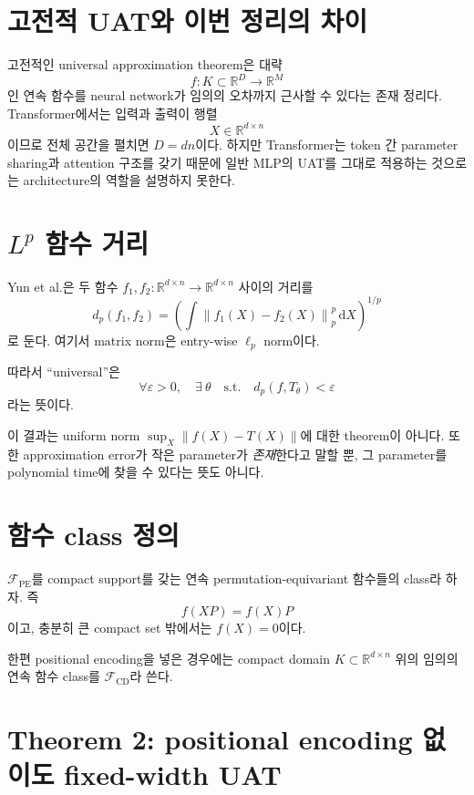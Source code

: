 \documentclass[11pt,a4paper,oneside,openany]{memoir}
\newcommand{\R}{\mathbb{R}}
\newcommand{\norm}[1]{\left\lVert #1\right\rVert}
\newcommand{\dd}{\,\mathrm{d}}
\theoremstyle{definition}
\begin{document}
\section{고전적 UAT와 이번 정리의 차이}

고전적인 universal approximation theorem은 대략
\[
f:K\subset\R^D\to\R^M
\]
인 연속 함수를 neural network가 임의의 오차까지 근사할 수 있다는 존재 정리다.
Transformer에서는 입력과 출력이 행렬
\[
X\in\R^{d\times n}
\]
이므로 전체 공간을 펼치면 $D=dn$이다. 하지만 Transformer는 token 간 parameter sharing과 attention 구조를 갖기 때문에
일반 MLP의 UAT를 그대로 적용하는 것으로는 architecture의 역할을 설명하지 못한다.

\section{\texorpdfstring{$L^p$}{Lp} 함수 거리}

Yun et al.은 두 함수 $f_1,f_2:\R^{d\times n}\to\R^{d\times n}$ 사이의 거리를
\[
d_p(f_1,f_2)
=
\left(\int
\norm{f_1(X)-f_2(X)}_p^p\dd X\right)^{1/p}
\]
로 둔다. 여기서 matrix norm은 entry-wise $\ell_p$ norm이다.

따라서 ``universal''은
\[
\forall \varepsilon>0,
\quad
\exists\ \theta
\quad\text{s.t.}\quad
 d_p(f,T_\theta)<\varepsilon
\]
라는 뜻이다.

\begin{warningbox}
이 결과는 uniform norm $\sup_X\norm{f(X)-T(X)}$에 대한 theorem이 아니다.
또한 approximation error가 작은 parameter가 \emph{존재}한다고 말할 뿐,
그 parameter를 polynomial time에 찾을 수 있다는 뜻도 아니다.
\end{warningbox}

\section{함수 class 정의}

$\mathcal F_{\mathrm{PE}}$를 compact support를 갖는 연속 permutation-equivariant 함수들의 class라 하자.
즉
\[
f(XP)=f(X)P
\]
이고, 충분히 큰 compact set 밖에서는 $f(X)=0$이다.

한편 positional encoding을 넣은 경우에는 compact domain $K\subset\R^{d\times n}$ 위의 임의의 연속 함수 class를
$\mathcal F_{\mathrm{CD}}$라 쓴다.

\section{Theorem 2: positional encoding 없이도 fixed-width UAT}
\end{document}
